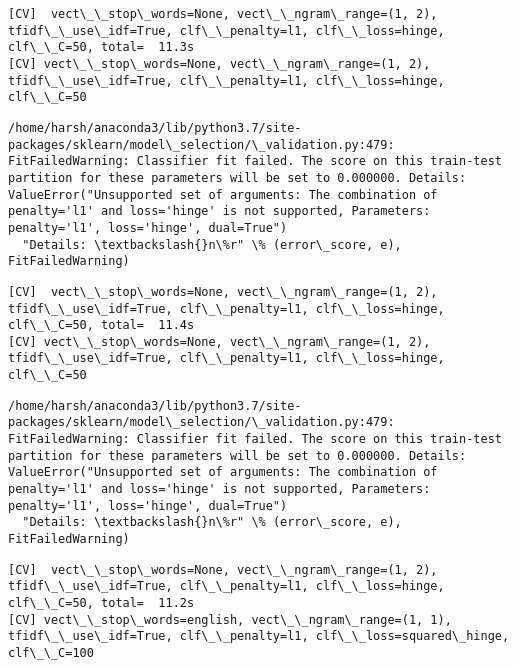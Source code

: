 \documentclass[11pt]{article}
\begin{document}
    \begin{Verbatim}[commandchars=\\\{\}]
[CV]  vect\_\_stop\_words=None, vect\_\_ngram\_range=(1, 2), tfidf\_\_use\_idf=True, clf\_\_penalty=l1, clf\_\_loss=hinge, clf\_\_C=50, total=  11.3s
[CV] vect\_\_stop\_words=None, vect\_\_ngram\_range=(1, 2), tfidf\_\_use\_idf=True, clf\_\_penalty=l1, clf\_\_loss=hinge, clf\_\_C=50 

    \end{Verbatim}

    \begin{Verbatim}[commandchars=\\\{\}]
/home/harsh/anaconda3/lib/python3.7/site-packages/sklearn/model\_selection/\_validation.py:479: FitFailedWarning: Classifier fit failed. The score on this train-test partition for these parameters will be set to 0.000000. Details: 
ValueError("Unsupported set of arguments: The combination of penalty='l1' and loss='hinge' is not supported, Parameters: penalty='l1', loss='hinge', dual=True")
  "Details: \textbackslash{}n\%r" \% (error\_score, e), FitFailedWarning)

    \end{Verbatim}

    \begin{Verbatim}[commandchars=\\\{\}]
[CV]  vect\_\_stop\_words=None, vect\_\_ngram\_range=(1, 2), tfidf\_\_use\_idf=True, clf\_\_penalty=l1, clf\_\_loss=hinge, clf\_\_C=50, total=  11.4s
[CV] vect\_\_stop\_words=None, vect\_\_ngram\_range=(1, 2), tfidf\_\_use\_idf=True, clf\_\_penalty=l1, clf\_\_loss=hinge, clf\_\_C=50 

    \end{Verbatim}

    \begin{Verbatim}[commandchars=\\\{\}]
/home/harsh/anaconda3/lib/python3.7/site-packages/sklearn/model\_selection/\_validation.py:479: FitFailedWarning: Classifier fit failed. The score on this train-test partition for these parameters will be set to 0.000000. Details: 
ValueError("Unsupported set of arguments: The combination of penalty='l1' and loss='hinge' is not supported, Parameters: penalty='l1', loss='hinge', dual=True")
  "Details: \textbackslash{}n\%r" \% (error\_score, e), FitFailedWarning)

    \end{Verbatim}

    \begin{Verbatim}[commandchars=\\\{\}]
[CV]  vect\_\_stop\_words=None, vect\_\_ngram\_range=(1, 2), tfidf\_\_use\_idf=True, clf\_\_penalty=l1, clf\_\_loss=hinge, clf\_\_C=50, total=  11.2s
[CV] vect\_\_stop\_words=english, vect\_\_ngram\_range=(1, 1), tfidf\_\_use\_idf=True, clf\_\_penalty=l1, clf\_\_loss=squared\_hinge, clf\_\_C=100 

    \end{Verbatim}
\end{document}
